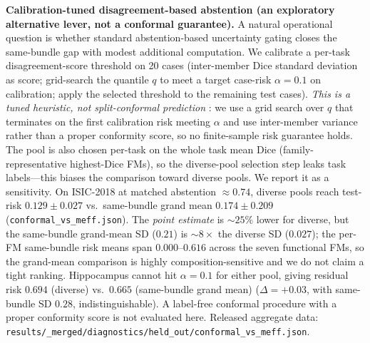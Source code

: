 \textbf{Calibration-tuned disagreement-based abstention (an exploratory alternative lever, not a conformal guarantee).} A natural operational question is whether standard abstention-based uncertainty gating closes the same-bundle gap with modest additional computation. We calibrate a per-task disagreement-score threshold on 20 cases (inter-member Dice standard deviation as score; grid-search the quantile $q$ to meet a target case-risk $\alpha{=}0.1$ on calibration; apply the selected threshold to the remaining test cases). \emph{This is a tuned heuristic, not split-conformal prediction} \citep{angelopoulos2021gentle}: we use a grid search over $q$ that terminates on the first calibration risk meeting $\alpha$ and use inter-member variance rather than a proper conformity score, so no finite-sample risk guarantee holds. The pool is also chosen per-task on the whole task mean Dice (family-representative highest-Dice FMs), so the diverse-pool selection step leaks task labels---this biases the comparison toward diverse pools. We report it as a sensitivity. On ISIC-2018 at matched abstention $\approx 0.74$, diverse pools reach test-risk $0.129{\pm}0.027$ vs.\ same-bundle grand mean $0.174{\pm}0.209$ (\texttt{conformal\_vs\_meff.json}). The \emph{point estimate} is $\sim 25\%$ lower for diverse, but the same-bundle grand-mean SD ($0.21$) is $\sim 8{\times}$ the diverse SD ($0.027$); the per-FM same-bundle risk means span $0.000$--$0.616$ across the seven functional FMs, so the grand-mean comparison is highly composition-sensitive and we do not claim a tight ranking. Hippocampus cannot hit $\alpha{=}0.1$ for either pool, giving residual risk $0.694$ (diverse) vs.\ $0.665$ (same-bundle grand mean) ($\Delta{=}+0.03$, with same-bundle SD $0.28$, indistinguishable). A label-free conformal procedure with a proper conformity score is not evaluated here. Released aggregate data: \texttt{results/\_merged/diagnostics/held\_out/conformal\_vs\_meff.json}.

